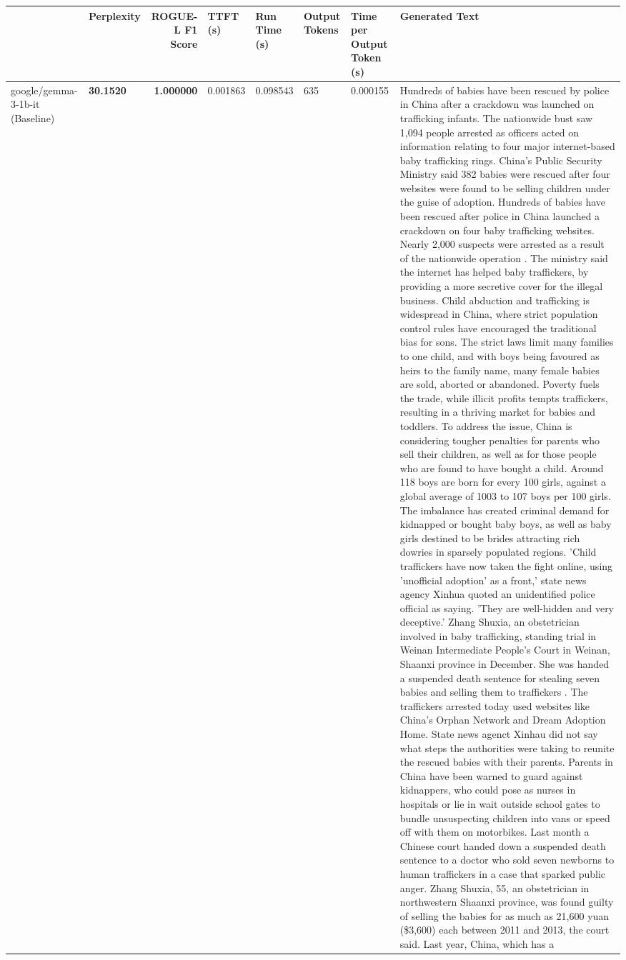 \begin{table}[H]
\label{tab:evaluation-pipeline-9}
\begin{tabular}{llrlllll}
\toprule
 & Perplexity & ROGUE-L F1 Score & TTFT (s) & Run Time (s) & Output Tokens & Time per Output Token (s) & Generated Text \\
\midrule
google/gemma-3-1b-it (Baseline) & \bfseries 30.1520 & \bfseries 1.000000 & 0.001863 & 0.098543 & 635 & 0.000155 & Hundreds of babies have been rescued by police in China after a crackdown was launched on trafficking infants. The nationwide bust saw 1,094 people arrested as officers acted on information relating to four major internet-based baby trafficking rings. China's Public Security Ministry said 382 babies were rescued after four websites were found to be selling children under the guise of adoption. Hundreds of babies have been rescued after police in China launched a crackdown on four baby trafficking websites. Nearly 2,000 suspects were arrested as a result of the nationwide operation . The ministry said the internet has helped baby traffickers, by providing a more secretive cover for the illegal business. Child abduction and trafficking is widespread in China, where strict population control rules have encouraged the traditional bias for sons. The strict laws limit many families to one child, and with boys being favoured as heirs to the family name, many female babies are sold, aborted or abandoned. Poverty fuels the trade, while illicit profits tempts traffickers, resulting in a thriving market for babies and toddlers. To address the issue, China is considering tougher penalties for parents who sell their children, as well as for those people who are found to have bought a child. Around 118 boys are born for every 100 girls, against a global average of 1003 to 107 boys per 100 girls. The imbalance has created criminal demand for kidnapped or bought baby boys, as well as baby girls destined to be brides attracting rich dowries in sparsely populated regions. 'Child traffickers have now taken the fight online, using 'unofficial adoption' as a front,' state news agency Xinhua quoted an unidentified police official as saying. 'They are well-hidden and very deceptive.' Zhang Shuxia, an obstetrician involved in baby trafficking, standing trial in Weinan Intermediate People's Court in Weinan, Shaanxi province in December. She was handed a suspended death sentence for stealing seven babies and selling them to traffickers . The traffickers arrested today used websites like China's Orphan Network and Dream Adoption Home. State news agenct Xinhau did not say what steps the authorities were taking to reunite the rescued babies with their parents. Parents in China have been warned to guard against kidnappers, who could pose as nurses in hospitals or lie in wait outside school gates to bundle unsuspecting children into vans or speed off with them on motorbikes. Last month a Chinese court handed down a suspended death sentence to a doctor who sold seven newborns to human traffickers in a case that sparked public anger. Zhang Shuxia, 55, an obstetrician in northwestern Shaanxi province, was found guilty of selling the babies for as much as 21,600 yuan (\$3,600) each between 2011 and 2013, the court said. Last year, China, which has a 
\end{tabular}
\end{table}

